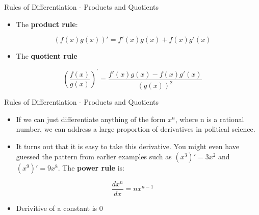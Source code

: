 \documentclass[
  ignorenonframetext,
]{beamer}
\providecommand{\tightlist}{%
  \setlength{\itemsep}{0pt}\setlength{\parskip}{0pt}}
\begin{document}
\begin{frame}{Rules of Differentiation - Products and Quotients}
\protect\hypertarget{rules-of-differentiation---products-and-quotients}{}

\begin{itemize}
\tightlist
\item
  The \textbf{product rule}:
\end{itemize}

\[(f(x)g(x))′ = f′(x)g(x) + f(x)g′(x)\]

\begin{itemize}
\tightlist
\item
  The \textbf{quotient rule}
\end{itemize}

\[ (\frac{f(x)}{g(x)})^{'} = \frac{f'(x)g(x)-f(x)g'(x)}{(g(x))^{2}} \]

\end{frame}

\begin{frame}{Rules of Differentiation - Products and Quotients}
\protect\hypertarget{rules-of-differentiation---products-and-quotients-1}{}

\begin{itemize}
\item
  If we can just differentiate anything of the form \(x^{n}\), where n
  is a rational number, we can address a large proportion of derivatives
  in political science.
\item
  It turns out that it is easy to take this derivative. You might even
  have guessed the pattern from earlier examples such as
  \((x^3)′ = 3x^2\) and \((x^9)′ = 9x^8\). The \textbf{power rule} is:
\end{itemize}

\[ \frac{dx^{n}}{dx}= nx^{n-1}\]

\begin{itemize}
\tightlist
\item
  Derivitive of a constant is 0
\end{itemize}

\end{frame}
\end{document}
